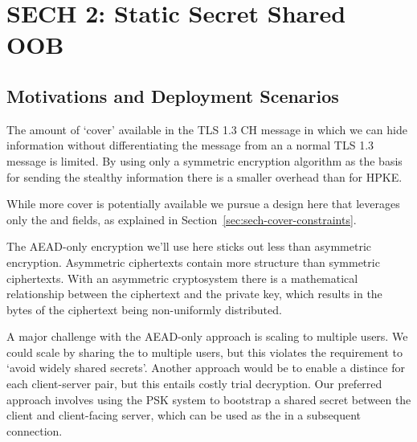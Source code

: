 \section{SECH 2: Static Secret Shared OOB}
\subsection{Motivations and Deployment Scenarios}

The amount of `cover' available in the TLS 1.3 \ac{CH} message in which we can hide information without differentiating the message from an a normal TLS 1.3 message is limited.
By using only a symmetric encryption algorithm as the basis for sending the stealthy information there is a smaller overhead than for \ac{HPKE}.

While more cover is potentially available we
pursue a design here that leverages only the
 and  fields,
as explained in Section~\ref{sec:sech-cover-constraints}.



The \ac{AEAD}-only encryption we'll use here
sticks out less than asymmetric encryption.
Asymmetric ciphertexts contain more structure
than symmetric ciphertexts.
With an asymmetric cryptosystem there is
a mathematical relationship between the ciphertext and the private key,
which results in the bytes of the ciphertext being non-uniformly distributed.


A major challenge with the \ac{AEAD}-only approach
is scaling to multiple users. We could scale by sharing the \varsechlongtermkey{} to
multiple users, but this violates the requirement to `avoid widely shared secrets'.
Another approach would be to enable a distince \varsechlongtermkey{} for each client-server pair,
but this entails costly trial decryption.
Our preferred approach involves using the \ac{PSK} system to bootstrap a shared secret between the client and client-facing server,
which can be used as the \varsechlongtermkey{}
in a subsequent connection.

